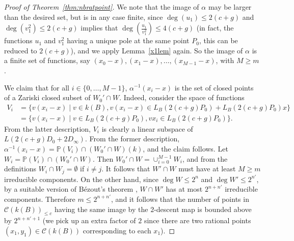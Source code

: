 \documentclass[11pt]{article}
\theoremstyle{plain}
\theoremstyle{definition}
\begin{document}
\begin{proof}[Proof of Theorem~\ref{thm:nbratpoint}]
We note that the image of $\alpha$ may be larger than the desired set, but is in any case finite, since $\deg(u_1)\leq 2(c+g)$ and $\deg(v_1^2)\leq 2(c+g)$ implies that $\deg(\frac{u_1}{v_1^2})\leq 4(c+g)$ (in fact, the functions $u_1$ and $v_1^2$ having a unique pole at the same point $P_0$, this can be reduced to $2(c+g)$), and we apply Lemma~\ref{x1lem} again. So the image of $\alpha$ is a finite set of functions, say $(x_0-x),(x_1-x),\ldots, (x_{M-1}-x)$, with $M\geq m$.


We claim that for all $i\in\{0,\dots,M-1\}$, $\alpha^{-1}(x_i-x)$ is the set of closed points of a Zariski closed subset of $W_0'\cap W$. Indeed, consider the space of functions 
\begin{align*}
V_i&=\{v(x_i-x)\mid v\in k(B), v(x_i-x)\in   L_B(2(c+g)P_0) + L_B(2(c+g)P_0)x\}\\
&=\{v(x_i-x)\mid v\in L_B(2(c+g)P_0), vx_i\in L_B(2(c+g)P_0)\}.
\end{align*}
From the latter description, $V_i$ is clearly a linear subspace of $L(2(c+g)D_0 + 2D_\infty)$. From the former description, $\alpha^{-1}(x_i-x)=\mathbb{P}(V_i)\cap (W_0'\cap W)(k)$, and the claim follows. Let $W_i=\mathbb{P}(V_i)\cap (W_0'\cap W)$. Then $W_0'\cap W=\cup_{i=0}^{M-1} W_i$, and from the definitions $W_i\cap W_j=\emptyset$ if $i\neq j$. It follows that $W'\cap W$ must have at least $M\geq m$ irreducible components. On the other hand, since $\deg W\leq 2^n$ and $\deg W'\leq 2^{n'}$, by a suitable version of B{\'e}zout's theorem \cite[Example 8.4.6]{Fulton98}, $W\cap W'$ has at most $2^{n+n'}$ irreducible components. Therefore $m\leq 2^{n+n'}$, and it follows that the number of points in ${\mathcal{C}}(k(B))_{\leq c}$ having the same image by the $2$-descent map is bounded above by $2^{n+n'+1}$ (we pick up an extra factor of $2$ since there are two rational points $(x_1,y_1)\in \mathcal{C}(k(B))$ corresponding to each $x_1$).



\end{proof}
\end{document}
